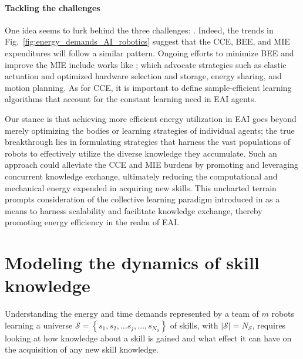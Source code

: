 \documentclass[12pt]{article}
\renewcommand{\emph}[1]{\textit{#1}}
\begin{document}
\paragraph*{\textbf{Tackling the challenges}}
One idea seems to lurk behind the three challenges: \emph{}. Indeed, the trends in Fig.~\ref{fig:energy_demands_AI_robotics} suggest that the CCE, BEE, and MIE expenditures will follow a similar pattern. Ongoing efforts to minimize BEE and improve the MIE include works like \cite{schroder2014, chalmers2015, mohammed2014, chemnitz2011}; which advocate strategies such as elastic actuation and optimized hardware selection and storage, energy sharing, and motion planning. As for CCE, it is important to define sample-efficient learning algorithms that account for the constant learning need in EAI agents. 

Our stance is that achieving more efficient energy utilization in EAI goes beyond merely optimizing the bodies or learning strategies of individual agents; the true breakthrough lies in formulating strategies that harness the vast populations of robots to effectively utilize the diverse knowledge they accumulate. Such an approach could alleviate the CCE and MIE burdens by promoting and leveraging concurrent knowledge exchange, ultimately reducing the computational and mechanical energy expended in acquiring new skills. This uncharted terrain prompts consideration of the collective learning paradigm introduced in \cite{Haddadin2014SystemzumErstellen,Haddadin2015Systemgeneratingsets} as a means to harness scalability and facilitate knowledge exchange, thereby promoting energy efficiency in the realm of EAI.

\section*{Modeling the dynamics of skill knowledge}\label{sec:knowledge_dynamics_model}
Understanding the energy and time demands represented by a team of $m$ robots learning a universe $\mathcal{S}=\left\lbrace s_1,s_2,\ldots s_j,\ldots, s_{N_\mathcal{S}}\right\rbrace$ of skills, with $|\mathcal{S}| = N_\mathcal{S}$, requires looking at how knowledge about a skill is gained and what effect it can have on the acquisition of any new skill knowledge. 
\end{document}
